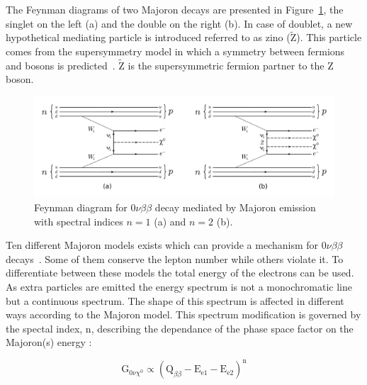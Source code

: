 \documentclass[main.tex]{subfiles}
\begin{document}


\NI The Feynman diagrams of two Majoron decays are presented in Figure~\ref{0nubbFeynmanDiagram_Majoron}, the singlet on the left (a) and the double on the right (b). In case of doublet, a new hypothetical mediating particle is introduced referred to as zino ($\tilde{\text{Z}}$). This particle comes from the supersymmetry model in which a symmetry between fermions and bosons is predicted~\cite{SUSYbasis}. $\tilde{\text{Z}}$ is the supersymmetric fermion partner to the Z boson.


\begin{figure}[h!]
\begin{center}
\includegraphics[scale=0.4]{pictures/Chap2/0nubbFeynmanDiagram_Majoron.pdf}
\caption{Feynman diagram for 0$\nu\beta\beta$ decay mediated by Majoron emission with spectral indices $n = 1$ (a) and $n = 2$ (b).}
\label{0nubbFeynmanDiagram_Majoron}
\end{center}
\end{figure}


\NI Ten different Majoron models exists which can provide a mechanism for 0$\nu\beta\beta$ decays~\cite{MajoronDecayMode}. Some of them conserve the lepton number while others violate it. To differentiate between these models the total energy of the electrons can be used. As extra particles are emitted the energy spectrum is not a monochromatic line but a continuous spectrum. The shape of this spectrum is affected in different ways according to the Majoron model. This spectrum modification is governed by the spectal index, n, describing the dependance of the phase space factor on the Majoron(s) energy : 


\begin{equation}
\text{G}_{\text{0}\nu\chi^\text{0}} \propto (\text{Q}_{\beta\beta} - \text{E}_{\text{e1}} - \text{E}_{\text{e2}})^\text{n}
\end{equation}
\end{document}
